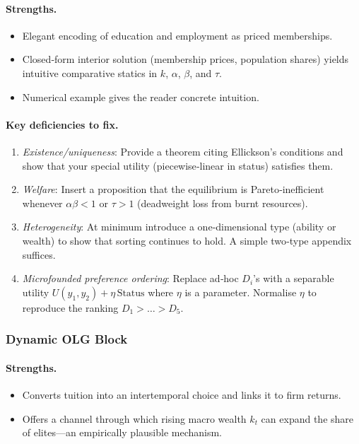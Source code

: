 \documentclass[12pt,letterpaper]{article}
\begin{document}
\paragraph{Strengths.}
\begin{itemize}
	\item Elegant encoding of education and employment as priced memberships.
	\item Closed‐form interior solution (membership prices, population shares) yields intuitive comparative statics in $k$, $\alpha$, $\beta$, and $\tau$.
	\item Numerical example gives the reader concrete intuition.
\end{itemize}

\paragraph{Key deficiencies to fix.}
\begin{enumerate}%
	\item \emph{Existence/uniqueness}: Provide a theorem citing Ellickson’s conditions and show that your special utility (piecewise‐linear in status) satisfies them.  
	\item \emph{Welfare}: Insert a proposition that the equilibrium is Pareto‐inefficient whenever $\alpha\beta<1$ or $\tau>1$ (deadweight loss from burnt resources).
	\item \emph{Heterogeneity}: At minimum introduce a one‐dimensional type (ability or wealth) to show that sorting continues to hold.  A simple two‐type appendix suffices.
	\item \emph{Microfounded preference ordering}: Replace ad‐hoc $D_i$’s with a separable utility $U(y_1,y_2)+\eta\,\text{Status}$ where $\eta$ is a parameter.  Normalise $\eta$ to reproduce the ranking $D_1>\dots>D_5$.
\end{enumerate}

\subsubsection{Dynamic OLG Block}

\paragraph{Strengths.}
\begin{itemize}
	\item Converts tuition into an intertemporal choice and links it to firm returns.
	\item Offers a channel through which rising macro wealth $k_t$ can expand the share of elites---an empirically plausible mechanism.
\end{itemize}
\end{document}
